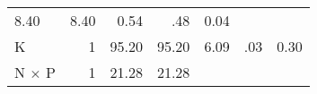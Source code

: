 \documentclass[]{article}
\begin{document}
\begin{longtable}[c]{@{}lrrrrrr@{}}
\begin{minipage}[t]{0.08\columnwidth}
8.40
\strut\end{minipage} &
\begin{minipage}[t]{0.08\columnwidth}\raggedleft\strut
8.40
\strut\end{minipage} &
\begin{minipage}[t]{0.07\columnwidth}\raggedleft\strut
0.54
\strut\end{minipage} &
\begin{minipage}[t]{0.07\columnwidth}\raggedleft\strut
.48
\strut\end{minipage} &
\begin{minipage}[t]{0.13\columnwidth}\raggedleft\strut
0.04
\strut\end{minipage}\tabularnewline
\begin{minipage}[t]{0.17\columnwidth}\raggedright\strut
K
\strut\end{minipage} &
\begin{minipage}[t]{0.08\columnwidth}\raggedleft\strut
1
\strut\end{minipage} &
\begin{minipage}[t]{0.08\columnwidth}\raggedleft\strut
95.20
\strut\end{minipage} &
\begin{minipage}[t]{0.08\columnwidth}\raggedleft\strut
95.20
\strut\end{minipage} &
\begin{minipage}[t]{0.07\columnwidth}\raggedleft\strut
6.09
\strut\end{minipage} &
\begin{minipage}[t]{0.07\columnwidth}\raggedleft\strut
.03
\strut\end{minipage} &
\begin{minipage}[t]{0.13\columnwidth}\raggedleft\strut
0.30
\strut\end{minipage}\tabularnewline
\begin{minipage}[t]{0.17\columnwidth}\raggedright\strut
N \(\times\) P
\strut\end{minipage} &
\begin{minipage}[t]{0.08\columnwidth}\raggedleft\strut
1
\strut\end{minipage} &
\begin{minipage}[t]{0.08\columnwidth}\raggedleft\strut
21.28
\strut\end{minipage} &
\begin{minipage}[t]{0.08\columnwidth}\raggedleft\strut
21.28
\strut\end{minipage} &
\begin{minipage}[t]{0.07\columnwidth}\raggedleft\strut

\end{minipage}
\end{longtable}
\end{document}
